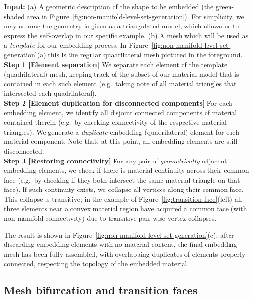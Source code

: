 \textbf{Input:} (a) A geometric description of the shape to be
embedded (the green-shaded area in
Figure~\ref{fig:non-manifold-level-set-generation}). For simplicity,
we may assume the geometry is given as a triangulated model, which
allows us to express the self-overlap in our specific example. (b) A
mesh which will be used as a \emph{template} for our embedding
process. In Figure~\ref{fig:non-manifold-level-set-generation}(a) this
is the regular quadrilateral mesh pictured in the foreground.
\\
\textbf{Step 1 [Element separation]} We separate each element of the
template (quadrilateral) mesh, keeping track of the subset of our
material model that is contained in each such element (e.g.\ taking
note of all material triangles that intersected each quadrilateral).
\\
\textbf{Step 2 [Element duplication for disconnected components]} For
each embedding element, we identify all disjoint connected components
of material contained therein (e.g.\ by checking connectivity of the
respective material triangles). We generate a \emph{duplicate}
embedding (quadrilateral) element for each material component. Note
that, at this point, all embedding elements are still disconnected.
\\
\textbf{Step 3 [Restoring connectivity]} For any pair of
\emph{geometrically} adjacent embedding elements, we check if there is
material continuity across their common face (e.g.\ by checking if
they both intersect the same material triangle on that face). If such
continuity exists, we collapse all vertices along their common
face. This collapse is transitive; in the example of
Figure~\ref{fig:transition-face}(left) all three elements near a
convex material region have acquired a common face (with non-manifold
connectivity) due to transitive pair-wise vertex collapses.

The result is shown in Figure~\ref{fig:non-manifold-level-set-generation}(c); after discarding embedding elements with no material content, the final embedding
mesh has been fully assembled, with overlapping duplicates of elements properly connected, respecting the topology of the embedded material.

 
\subsection{Mesh bifurcation and transition faces}

